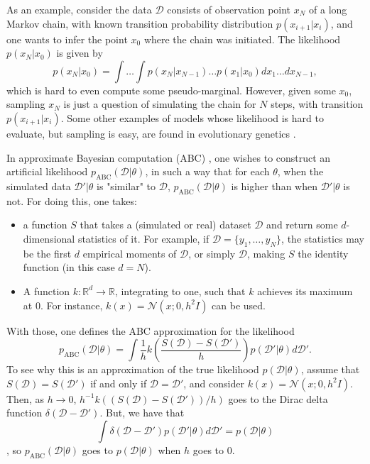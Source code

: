 As an example, consider the data $\mathcal{D}$ consists of observation point $x_N$ of a long Markov chain, with known transition probability distribution $p(x_{i+1}|x_i)$, and one wants to infer the point $x_0$ where the chain was initiated. The likelihood $p(x_N|x_0)$ is given by
\begin{equation}
 p(x_N|x_0) = \int \ldots \int p(x_N|x_{N-1}) \ldots p(x_1|x_0) dx_1 \ldots dx_{N-1},
\end{equation}
which is hard to even compute some pseudo-marginal. However, given some $x_0$, sampling $x_N$ is just a question of simulating the chain for $N$ steps, with transition $p(x_{i+1}|x_i)$. Some other examples of models whose likelihood is hard to evaluate, but sampling is easy, are found in evolutionary genetics \cite{Pritchard_1999,Beaumont_2003}.

In approximate Bayesian computation (ABC) \cite{Fearnhead_2012,Beaumont_2003}, one wishes to construct an artificial likelihood $p_{\text{ABC}}(\mathcal{D}|\theta)$, in such a way that for each $\theta$, when the simulated data $\mathcal{D}'|\theta$ is "similar" to $\mathcal{D}$, $p_{\text{ABC}}(\mathcal{D}|\theta)$ is higher than when $\mathcal{D}'|\theta$ is not. For doing this, one takes:
\begin{itemize}
	\item a function $S$ that takes a (simulated or real) dataset $\mathcal{D}$ and return some $d$-dimensional statistics of it.
	For example, if $\mathcal{D} = \{y_1,\ldots,y_N\}$, the statistics may be the first $d$ empirical moments of $\mathcal{D}$, or simply $\mathcal{D}$, making $S$ the identity function (in this case $d=N$).
	\item A function $k:\mathbb{R}^d \to \mathbb{R}$, integrating to one, such that $k$ achieves its maximum at $0$. For instance, $k(x) = \mathcal{N}(x;0,h^2 I)$ can be used.
\end{itemize}
With those, one defines the ABC approximation for the likelihood
\begin{equation}\label{abclikelihood}
 p_{\text{ABC}}(\mathcal{D}|\theta) = \int \frac{1}{h}k\left(\frac{S(\mathcal{D}) - S(\mathcal{D}')}{h}\right) p(\mathcal{D}'|\theta) d\mathcal{D}'.
\end{equation}
To see why this is an approximation of the true likelihood $p(\mathcal{D}|\theta)$, assume that $S(\mathcal{D}) = S(\mathcal{D}')$ if and only if $\mathcal{D} = \mathcal{D}'$, and consider $k(x) = \mathcal{N}(x;0,h^2 I)$. Then, as $h \to 0$, $h^{-1}k((S(\mathcal{D}) - S(\mathcal{D}'))/h)$ goes to the Dirac delta function $\delta(\mathcal{D} - \mathcal{D}')$. But, we have that 
\begin{equation}
\int \delta(\mathcal{D} - \mathcal{D}') p(\mathcal{D}'|\theta) d \mathcal{D}' = p(\mathcal{D}|\theta)
\end{equation},
so $p_{\text{ABC}}(\mathcal{D}|\theta)$ goes to $p(\mathcal{D}|\theta)$ when $h$ goes to $0$.

